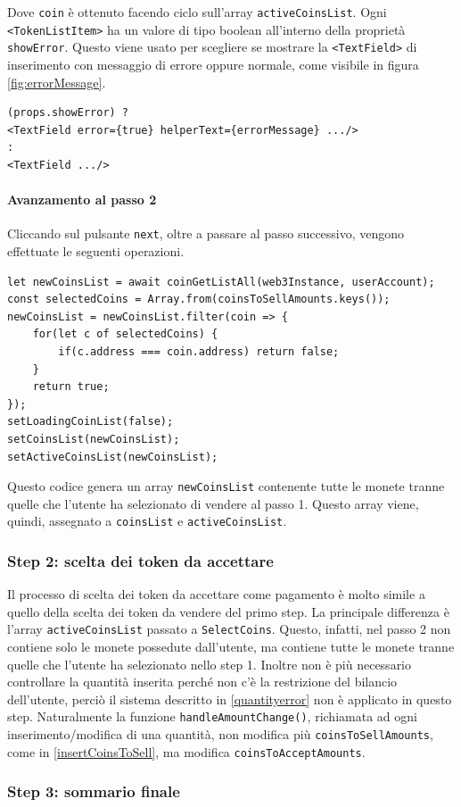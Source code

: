 \documentclass[a4paper]{article}
\begin{document}
        Dove \verb|coin| è ottenuto facendo ciclo sull'array \verb|activeCoinsList|.
        \newline
        Ogni \verb|<TokenListItem>| ha un valore di tipo boolean all'interno della proprietà \verb|showError|. Questo viene usato per scegliere se mostrare la \verb|<TextField>| di inserimento con messaggio di errore oppure normale, come visibile in figura \ref{fig:errorMessage}.
\begin{lstlisting}[style=ES6, title={Scelta di TextField da mostrare}]
(props.showError) ?
<TextField error={true} helperText={errorMessage} .../>
:
<TextField .../>\end{lstlisting}
        \paragraph{Avanzamento al passo 2}
        Cliccando sul pulsante \verb|next|, oltre a passare al passo successivo, vengono effettuate le seguenti operazioni.
\begin{lstlisting}[style=ES6, title={Codice eseguito passando al passo 2}]
let newCoinsList = await coinGetListAll(web3Instance, userAccount);
const selectedCoins = Array.from(coinsToSellAmounts.keys());
newCoinsList = newCoinsList.filter(coin => {
    for(let c of selectedCoins) {
        if(c.address === coin.address) return false;
    }
    return true;
});
setLoadingCoinList(false);
setCoinsList(newCoinsList);
setActiveCoinsList(newCoinsList);\end{lstlisting}
        Questo codice genera un array \verb|newCoinsList| contenente tutte le monete tranne quelle che l'utente ha selezionato di vendere al passo 1. Questo array viene, quindi, assegnato a \verb|coinsList| e \verb|activeCoinsList|.

        \subsubsection{Step 2: scelta dei token da accettare}
        Il processo di scelta dei token da accettare come pagamento è molto simile a quello della scelta dei token da vendere del primo step. La principale differenza è l'array \verb|activeCoinsList| passato a \verb|SelectCoins|.
        Questo, infatti, nel passo 2 non contiene solo le monete possedute dall'utente, ma contiene tutte le monete tranne quelle che l'utente ha selezionato nello step 1.
        \newline
        Inoltre non è più necessario controllare la quantità inserita perché non c'è la restrizione del bilancio dell'utente, perciò il sistema descritto in \ref{quantityerror} non è applicato in questo step.
        Naturalmente la funzione \verb|handleAmountChange()|, richiamata ad ogni inserimento/modifica di una quantità, non modifica più \verb|coinsToSellAmounts|, come in \ref{insertCoinsToSell}, ma modifica \verb|coinsToAcceptAmounts|.

        \subsubsection{Step 3: sommario finale}

        \newpage
        \printbibliography
\end{document}
